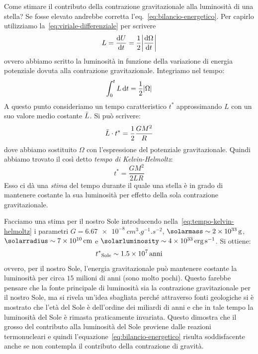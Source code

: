 Come stimare il contributo della contrazione gravitazionale alla luminosità di una stella? Se fosse elevato andrebbe corretta l'eq.~\eqref{eq:bilancio-energetico}. Per capirlo utilizziamo la~\eqref{eq:viriale-differenziale} per scrivere
\[
L = \frac{\ud U}{\ud t} = \frac{1}{2} \abs*{\frac{\ud \Omega}{\ud t}}
\]
ovvero abbiamo scritto la luminosità in funzione della variazione di energia potenziale dovuta alla contrazione gravitazionale. Integriamo nel tempo:
\[
\int_0^t L \mathop{}\!\mathrm{d} t = \frac{1}{2} \lvert\Omega\rvert
\]
A questo punto consideriamo un tempo caratteristico $t^*$ approssimando $L$ con un suo valore medio costante $\Bar{L}$. Si può scrivere:
\[
\Bar{L} \cdot t^* = \frac{1}{2} \frac{GM^2}{R}
\]
dove abbiamo sostituito $\Omega$ con l'espressione del potenziale gravitazionale. Quindi abbiamo trovato il così detto \emph{tempo di Kelvin-Helmoltz}:
\begin{equation}\label{eq:tempo-kelvin-helmoltz}
    t^* = \dfrac{GM^2}{2LR}
\end{equation}
Esso ci dà una \emph{stima} del tempo durante il quale una stella è in grado di  mantenere costante la sua luminosità per effetto della sola contrazione gravitazionale. 

Facciamo una stima per il nostro Sole introducendo nella~\eqref{eq:tempo-kelvin-helmoltz} i parametri $G = \SI{6.67e-8}{cm^3.g^{-1}.s^{-2}}$, $\si{\solarmass} \sim \SI{2e33}{g}$, $\si{\solarradius} \sim \SI{7e10}{cm}$ e $\si{\solarluminosity} \sim \SI{4e33}{erg.s^{-1}}$. Si ottiene:
\[
{t^*}_\textup{Sole} \sim \SI{1.5e7}{anni}
\]
ovvero, per il nostro Sole, l'energia gravitazionale può mantenere costante la luminosità per circa $15$ milioni di anni (sono molto pochi). Questo farebbe pensare che la fonte principale di luminosità sia la contrazione gravitazionale per il nostro Sole, ma si rivela un'idea sbagliata perché attraverso fonti geologiche si è mostrato che l'età del Sole è dell'ordine dei miliardi di anni e che in tale tempo la luminosità del Sole è rimasta praticamente invariata. Questo dimostra che il grosso del contributo alla luminosità del Sole proviene dalle reazioni termonucleari e quindi l'equazione~\eqref{eq:bilancio-energetico} risulta soddisfacente anche se non contempla il contributo della contrazione di gravità.